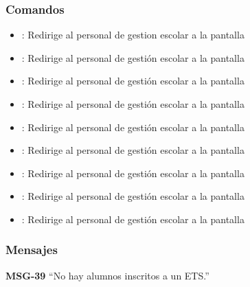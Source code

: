 \subsubsection{Comandos}
\begin{itemize}
	\item {}: Redirige al personal de gestion escolar a la pantalla 
	
	\item {}: Redirige al personal de gestión escolar a la pantalla 
	\item {}: Redirige al personal de gestión escolar a la pantalla 
	
	\item {}: Redirige al personal de gestión escolar a la pantalla 
	\item {}: Redirige al personal de gestión escolar a la pantalla 
	
	\item {}: Redirige al personal de gestión escolar a la pantalla 
	\item {}: Redirige al personal de gestión escolar a la pantalla 
	
	\item {}: Redirige al personal de gestión escolar a la pantalla 
	\item {}: Redirige al personal de gestión escolar a la pantalla    
\end{itemize}

\subsubsection{Mensajes}

\begin{Citemize}
	\item {\bf MSG-39}  ``No hay alumnos inscritos a un ETS.''
\end{Citemize}

